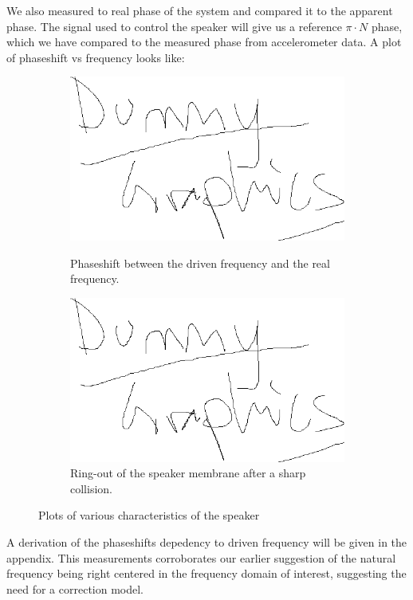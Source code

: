 \documentclass[12pt,oneside,a4paper]{article}
\numberwithin{equation}{section}
\begin{document}
{{{{We also measured to real phase of the system and compared it to the apparent phase. The signal used to control the speaker will give us a reference $\pi\cdot N$ phase, which we have compared to the measured phase from accelerometer data. A plot of phaseshift vs frequency looks like:
\begin{figure}[h]
	\centering
	\begin{subfigure}{0.5\textwidth}
		\centering
		\includegraphics[width=\textwidth]{dummy.png} \label{phaseshift_plot}
		\caption{Phaseshift between the driven frequency and the real frequency.}
	\end{subfigure}%
	\begin{subfigure}{0.5\textwidth}
		\centering
		\includegraphics[width=\textwidth]{dummy.png}
		\caption{Ring-out of the speaker membrane after a sharp collision.}
	\end{subfigure}
	\caption{Plots of various characteristics of the speaker}
\end{figure}
A derivation of the phaseshifts depedency to driven frequency will be given in the appendix. This measurements corroborates our earlier suggestion of the natural frequency being right centered in the frequency domain of interest, suggesting the need for a correction model. 

}}}}
\end{document}
